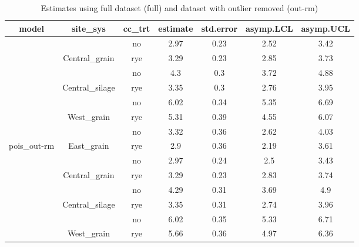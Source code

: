 \documentclass[]{article}
\begin{document}
\begin{table}[H]

\caption{\label{tab:estimates}Estimates using full dataset (full) and dataset with outlier removed (out-rm)}
\centering
\begin{tabular}[t]{ccccccc}
\toprule
model & site\_sys & cc\_trt & estimate & std.error & asymp.LCL & asymp.UCL\\
\midrule
\rowcolor{gray!6}   &  & no & 2.97 & 0.23 & 2.52 & 3.42\\

 & \multirow{-2}{*}{\centering\arraybackslash Central\_grain} & rye & 3.29 & 0.23 & 2.85 & 3.73\\

\rowcolor{gray!6}   &  & no & 4.3 & 0.3 & 3.72 & 4.88\\

 & \multirow{-2}{*}{\centering\arraybackslash Central\_silage} & rye & 3.35 & 0.3 & 2.76 & 3.95\\

\rowcolor{gray!6}   &  & no & 6.02 & 0.34 & 5.35 & 6.69\\

 & \multirow{-2}{*}{\centering\arraybackslash West\_grain} & rye & 5.31 & 0.39 & 4.55 & 6.07\\

\rowcolor{gray!6}   &  & no & 3.32 & 0.36 & 2.62 & 4.03\\

\multirow{-8}{*}{\centering\arraybackslash pois\_out-rm} & \multirow{-2}{*}{\centering\arraybackslash East\_grain} & rye & 2.9 & 0.36 & 2.19 & 3.61\\
\cmidrule{1-7}
\rowcolor{gray!6}   &  & no & 2.97 & 0.24 & 2.5 & 3.43\\

 & \multirow{-2}{*}{\centering\arraybackslash Central\_grain} & rye & 3.29 & 0.23 & 2.83 & 3.74\\

\rowcolor{gray!6}   &  & no & 4.29 & 0.31 & 3.69 & 4.9\\

 & \multirow{-2}{*}{\centering\arraybackslash Central\_silage} & rye & 3.35 & 0.31 & 2.74 & 3.96\\

\rowcolor{gray!6}   &  & no & 6.02 & 0.35 & 5.33 & 6.71\\

 & \multirow{-2}{*}{\centering\arraybackslash West\_grain} & rye & 5.66 & 0.36 & 4.97 & 6.36\\


\end{tabular}
\end{table}
\end{document}

